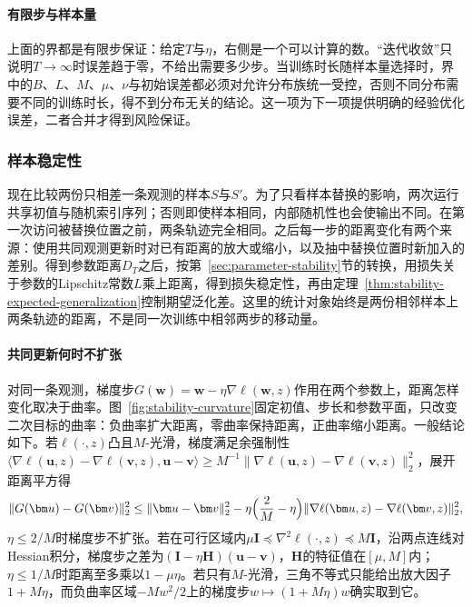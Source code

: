 \paragraph{有限步与样本量}

上面的界都是有限步保证：给定$T$与$\eta$，右侧是一个可以计算的数。“迭代收敛”只说明$T\to\infty$时误差趋于零，不给出需要多少步。当训练时长随样本量选择时，界中的$B$、$L$、$M$、$\mu$、$\nu$与初始误差都必须对允许分布族统一受控，否则不同分布需要不同的训练时长，得不到分布无关的结论。这一项为下一项提供明确的经验优化误差，二者合并才得到风险保证。

\subsubsection{样本稳定性}
\label{sec:sgd-stability}

现在比较两份只相差一条观测的样本$S$与$S'$。为了只看样本替换的影响，两次运行共享初值与随机索引序列；否则即使样本相同，内部随机性也会使输出不同。在第一次访问被替换位置之前，两条轨迹完全相同。之后每一步的距离变化有两个来源：使用共同观测更新时对已有距离的放大或缩小，以及抽中替换位置时新加入的差别。得到参数距离$D_T$之后，按第~\ref{sec:parameter-stability}节的转换，用损失关于参数的Lipschitz常数$L$乘上距离，得到损失稳定性，再由定理~\ref{thm:stability-expected-generalization}控制期望泛化差。这里的统计对象始终是两份相邻样本上两条轨迹的距离，不是同一次训练中相邻两步的移动量。

\paragraph{共同更新何时不扩张}

对同一条观测，梯度步$G(\bm w)=\bm w-\eta\nabla\ell(\bm w,z)$作用在两个参数上，距离怎样变化取决于曲率。图~\ref{fig:stability-curvature}固定初值、步长和参数平面，只改变二次目标的曲率：负曲率扩大距离，零曲率保持距离，正曲率缩小距离。一般结论如下。若$\ell(\cdot,z)$凸且$M$-光滑，梯度满足余强制性$\langle\nabla\ell(\bm u,z)-\nabla\ell(\bm v,z),\bm u-\bm v\rangle\geq M^{-1}\|\nabla\ell(\bm u,z)-\nabla\ell(\bm v,z)\|_2^2$，展开距离平方得
\[
 \|G(\bm u)-G(\bm v)\|_2^2\leq\|\bm u-\bm v\|_2^2-\eta\Bigl(\frac2M-\eta\Bigr)\|\nabla\ell(\bm u,z)-\nabla\ell(\bm v,z)\|_2^2,
\]
$\eta\leq2/M$时梯度步不扩张。若在可行区域内$\mu\bm I\preceq\nabla^2\ell(\cdot,z)\preceq M\bm I$，沿两点连线对Hessian积分，梯度步之差为$(\bm I-\eta\bm H)(\bm u-\bm v)$，$\bm H$的特征值在$[\mu,M]$内；$\eta\leq1/M$时距离至多乘以$1-\mu\eta$。若只有$M$-光滑，三角不等式只能给出放大因子$1+M\eta$，而负曲率区域$-Mw^2/2$上的梯度步$w\mapsto(1+M\eta)w$确实取到它。

